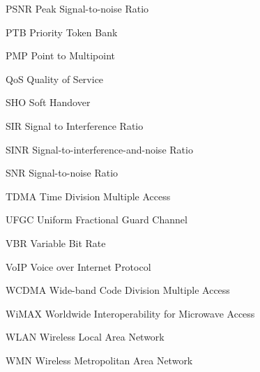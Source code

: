 \begin{denotation}
  \item[PSNR] Peak Signal-to-noise Ratio 
  \item[PTB] Priority Token Bank
  \item[PMP] Point to Multipoint
  \item[QoS] Quality of Service
  \item[SHO] Soft Handover
  \item[SIR] Signal to Interference Ratio
  \item[SINR]Signal-to-interference-and-noise Ratio
  \item[SNR] Signal-to-noise Ratio
  \item[TDMA]Time Division Multiple Access
  \item[UFGC] Uniform Fractional Guard Channel
  \item[VBR] Variable Bit Rate
  \item[VoIP] Voice over Internet Protocol 
  \item[WCDMA] Wide-band Code Division Multiple Access
  \item[WiMAX] Worldwide Interoperability for Microwave Access
  \item[WLAN] Wireless Local Area Network
  \item[WMN] Wireless Metropolitan Area Network
\end{denotation}
